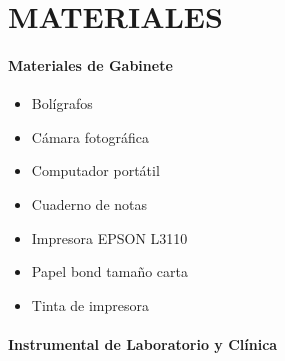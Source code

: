 \clearpage

\section{MATERIALES}

\paragraph*{Materiales de Gabinete}

\begin{itemize}[label={\textbullet}, left=0pt, itemsep=0pt, topsep=0pt, parsep=0pt, partopsep=0pt]
	\item Bolígrafos
	\item Cámara fotográfica
	\item Computador portátil
	\item Cuaderno de notas
	\item Impresora EPSON L3110
	\item Papel bond tamaño carta
	\item Tinta de impresora
\end{itemize}

\paragraph*{Instrumental de Laboratorio y Clínica}

